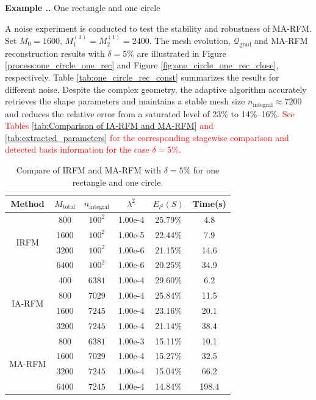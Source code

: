 \documentclass{article}
\newcommand{\red}[1]{\textcolor{red}{#1}}
\theoremstyle{plain}
\theoremstyle{definition}
\newcounter{example}[section]         %
\renewcommand{\theexample}{\thesection.\arabic{example}}
\newenvironment{example}[1][]{
    \refstepcounter{example}%
    \par\noindent\textbf{Example \theexample.} #1 \par
}{\par}
\begin{document}
{\begin{example}[{One rectangle and one circle}]
 { A noise experiment is conducted to test the stability and robustness of MA-RFM. Set $M_0=1600$, $M_1^{(1)}=M_2^{(1)}=2400$. The mesh evolution, $\mathcal{Q}_{\text{grad}}$ and MA-RFM reconstruction results with $\delta=5\%$ are illustrated in Figure \ref{process:one_circle_one_rec} and Figure \ref{fig:one_circle_one_rec_close}, respectively.}
  {Table \ref{tab:one_circle_rec_const} summarizes the results for different noise. Despite the complex geometry, the adaptive algorithm accurately retrieves the shape parameters and maintains a stable mesh size $n_{\text{integral}} \approx 7200$ and reduces the relative error from a saturated level of 23\% to 14\%--16\%.} \red{See Tables \ref{tab:Comparison of IA-RFM and MA-RFM} and \ref{tab:extracted_parameters} for the corresponding stagewise comparison and detected basis information for the case $\delta=5\%$.}
\begin{table}[htbp]
    \centering
    \caption{Compare of IRFM and MA-RFM with $\delta=5\%$ for one rectangle and one circle.}
    \begin{tabular}{cccccc}
        \toprule
        Method & $M_{\text{total}}$ & $n_{\text{integral}}$ &  $\lambda^2$ & $E_{l^2}(S)$  &Time(s) \\
        \midrule
        \multirow{4}{*}{IRFM}
        &800 &$100^2$ &1.00e-4&25.79\%&4.8\\
        &1600&$100^2$ &1.00e-5&22.44\%&7.9\\
        &3200 &$100^2$ &1.00e-6&21.15\%&14.6\\
        &6400&$100^2$ &1.00e-6&20.25\%&34.9\\
        \hline
        \multirow{4}{*}{IA-RFM}
        &400 &$6381$ &1.00e-4&29.60\%&6.2\\
        &800&$7029$ &1.00e-4&25.84\%&11.5\\
        &1600 &$7245$ &1.00e-4&23.16\%&20.1\\
        &3200&$7245$ &1.00e-4&21.14\%&38.4\\
        \hline
        \multirow{4}{*}{MA-RFM}
        &800 &$6381$&1.00e-3&15.11\%&10.1\\
        &1600&$7029$&1.00e-4&15.27\%&32.5\\
        &3200 &$7245$&1.00e-4&15.04\%&66.2\\
        &6400&$7245$&1.00e-4&14.84\%&198.4\\
        \bottomrule
    \end{tabular}
    \label{tab:compare_one_circel_one_rec}
\end{table}


\end{example}}
\end{document}
